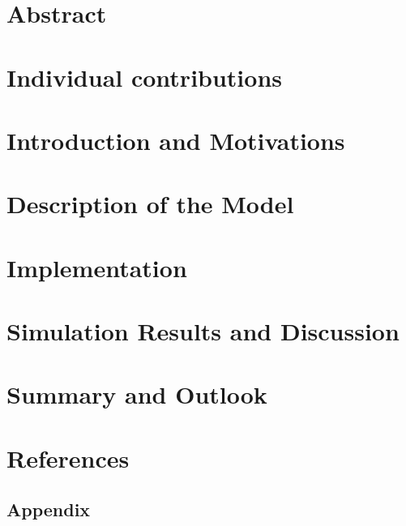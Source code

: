\documentclass[11pt]{article}
\begin{document}

\section{Abstract}


\section{Individual contributions}


\section{Introduction and Motivations}


\section{Description of the Model}


\section{Implementation}


\section{Simulation Results and Discussion}


\section{Summary and Outlook}


\section{References}



\begin{appendix}
\section{Appendix}

\end{appendix}



\end{document}
